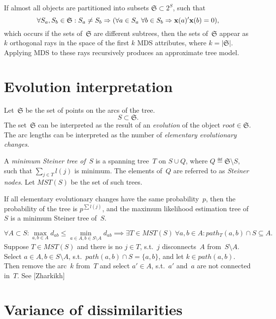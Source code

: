 \documentclass[10pt,a4paper]{article}
\theoremstyle{plain} \newtheorem{Lem}{Lemma}
\begin{document}
If almost all objects are partitioned into subsets $\mathfrak S \subset 2^S$, such that
$$ \forall S_a, S_b \in \mathfrak S : S_a \ne S_b 
  \Rightarrow (\forall a \in S_a \ \forall b \in S_b \Rightarrow \mathbf x(a)' \mathbf x(b) = 0), 
$$
which occurs if the sets of~$\mathfrak S$ are different subtrees,
then the sets of~$\mathfrak S$ appear as $k$ orthogonal rays in the space of the first $k$ MDS attributes,
where $k = |\mathfrak S|$.
Applying MDS to these rays recursively produces an approximate tree model.



\section{Evolution interpretation}
Let~$\mathfrak S$ be the set of points on the arcs of the tree.
$$ S \subset \mathfrak S. $$
The set~$\mathfrak S$ can be interpreted as the result of an {\em evolution} of the object $root \in \mathfrak S$.
The arc lengths can be interpreted as the number of {\em elementary evolutionary changes}.

A {\em minimum Steiner tree of~$S$} is a spanning tree~$T$ on $S \cup Q$, where $Q \eqdef \mathfrak S \setminus S$, 
such that $\sum_{j \in T} l(j)$ is minimum.
The elements of~$Q$ are referred to as {\em Steiner nodes}.
Let $MST(S)$ be the set of such trees.

If all elementary evolutionary changes have the same probability~$p$,
then the probability of the tree is $p^{\sum l(j)}$,
and the maximum likelihood estimation tree of~$S$ is a minimum Steiner tree of~$S$.

{ $$ \forall A \subset S : \max_{a,b \in A} d_{ab} \le \min_{a \in A, b \in S \setminus A} d_{ab} \implies 
    \exists T \in MST(S) \ \forall a,b \in A : path_T(a,b) \cap S \subseteq A. 
  $$
}
\proof
{ Suppose $T \in MST(S)$ and there is no $j \in T$, s.t.~$j$ disconnects~$A$ from~$S \setminus A$.
  Select $a \in A, b \in S \setminus A$, s.t.~$path(a,b) \cap S = \{a,b\}$, and let $k \in path(a,b)$.
  Then remove the arc~$k$ from~$T$ and select $a' \in A$, s.t.~$a'$ and~$a$ are not connected in~$T$.
  See [Zharkikh]
}



\section{Variance of dissimilarities}
\end{document}
